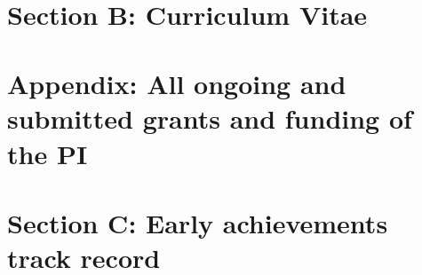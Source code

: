 \documentclass[11pt,a4paper]{article}
\begin{document}



\clearpage



~ 


\clearpage

%

\section*{Section B: Curriculum Vitae}

\clearpage

\section*{Appendix: All ongoing and submitted grants and funding of the PI}

%

\clearpage

\section*{Section C: Early achievements track record}

%
\end{document}
